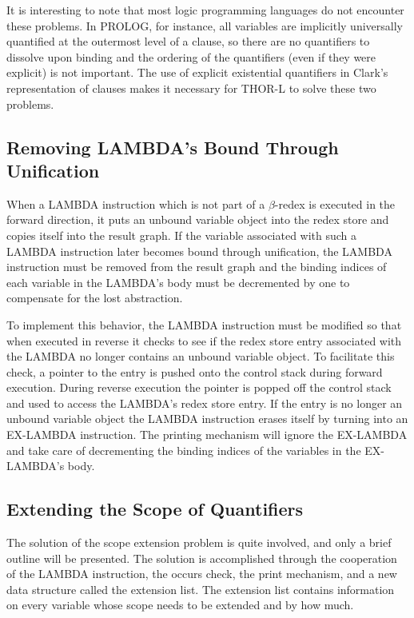 It is interesting to note that most logic programming languages do not encounter
these problems. In PROLOG, for instance, all variables are implicitly
universally quantified at the outermost level of a clause, so there are no
quantifiers to dissolve upon binding and the ordering of the quantifiers (even
if they were explicit) is not important. The use of explicit existential
quantifiers in Clark's representation of clauses makes it necessary for THOR-L
to solve these two problems.

\subsection{Removing LAMBDA's Bound Through Unification}

When a LAMBDA instruction which is not part of a \(\beta\)-redex is executed in
the forward direction, it puts an unbound variable object into the redex store
and copies itself into the result graph. If the variable associated with such a
LAMBDA instruction later becomes bound through unification, the LAMBDA
instruction must be removed from the result graph and the binding indices of
each variable in the LAMBDA's body must be decremented by one to compensate for
the lost abstraction.

To implement this behavior, the LAMBDA instruction must be modified so that when
executed in reverse it checks to see if the redex store entry associated with
the LAMBDA no longer contains an unbound variable object. To facilitate this
check, a pointer to the entry is pushed onto the control stack during forward
execution. During reverse execution the pointer is popped off the control stack
and used to access the LAMBDA's redex store entry. If the entry is no longer an
unbound variable object the LAMBDA instruction erases itself by turning into an
EX-LAMBDA instruction. The printing mechanism will ignore the EX-LAMBDA and take
care of decrementing the binding indices of the variables in the EX-LAMBDA's
body.

\subsection{Extending the Scope of Quantifiers}

The solution of the scope extension problem is quite involved, and only a brief
outline will be presented. The solution is accomplished through the cooperation
of the LAMBDA instruction, the occurs check, the print mechanism, and a new data
structure called the extension list. The extension list contains information on
every variable whose scope needs to be extended and by how much.

